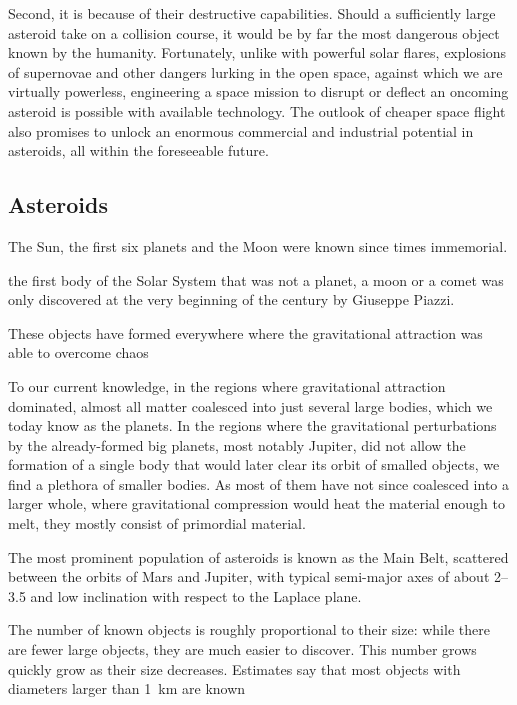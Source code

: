     Second, it is because of their destructive capabilities.
    Should a sufficiently large asteroid take on a collision course, it would be by far the most dangerous object
    known by the humanity. Fortunately, unlike with powerful solar flares, explosions of supernovae and other
    dangers lurking in the open space, against which we are virtually powerless,
    engineering a space mission to disrupt or deflect an oncoming asteroid is possible with available technology.
    The outlook of cheaper space flight also promises to unlock an enormous commercial and industrial potential in asteroids,
    all within the foreseeable future.

    \subsection{Asteroids} \label{iaa}
        The Sun, the first six planets and the Moon were known since times immemorial.


        the first body of the Solar System that was not a planet, a moon or a comet was only discovered at
        the very beginning of the  century by Giuseppe Piazzi.

        These objects have formed everywhere where the gravitational attraction was able to overcome chaos \citep{???}

        To our current knowledge, in the regions where gravitational attraction dominated, almost all matter
        coalesced into just several large bodies, which we today know as the planets.
        In the regions where the gravitational perturbations by the already-formed big planets, most notably Jupiter,
        did not allow the formation of a single body that would later clear its orbit of smalled objects,
        we find a plethora of smaller bodies. As most of them have not since coalesced into a larger whole,
        where gravitational compression would heat the material enough to melt, they mostly consist of primordial material.

        The most prominent population of asteroids is known as the Main Belt, scattered between the orbits
        of Mars and Jupiter, with typical semi-major axes of about \SIrange{2}{3.5}{\au} and low inclination
        with respect to the Laplace plane.

        The number of known objects is roughly proportional to their size: while there are fewer large objects,
        they are much easier to discover. This number grows quickly grow as their size decreases.
        Estimates say that most objects with diameters larger than \SI{1}{\kilo\metre} are known

